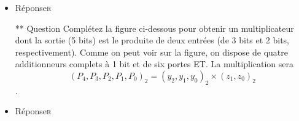 \documentclass[11pt]{article}
\begin{document}
\begin{itemize}
\item Réponse\hfill{}\textsc{r}
\label{sec:org0b1be6a}

  ** Question
Complétez la figure ci-dessous pour obtenir un multiplicateur dont
  la sortie (5 bits) est le produite de deux entrées (de 3 bits et 2
  bits, respectivement). Comme on peut voir sur la figure, on dispose
  de quatre additionneurs complets à 1 bit et de six portes ET. La
  multiplication sera $$(P_4, P_3, P_2, P_1, P_0)_2 = (y_2, y_1, y_0)_2
    \times (z_1, z_0)_2$$.
  \begin{center}

\end{center}

\item Réponse\hfill{}\textsc{r}
\label{sec:org9d8a6f2}
\end{itemize}
\end{document}
